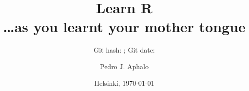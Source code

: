 \documentclass[paper=a4,headsepline,BCOR=12mm,twoside,open=right,%
titlepage,headings=small,fontsize=10pt,index=totoc,bibliography=totoc,%
captions=tableheading,captions=nooneline]{scrbook}\usepackage{knitr}
\begin{document}
\renewcommand*\chapterformat{\thechapter\autodot\hspace{1em}}

\renewcommand*\dictumwidth{0.7\linewidth}
\renewcommand*\dictumauthorformat[1]{--- #1}

\extratitle{\vspace*{2\baselineskip}%
             {\Huge\textsf{\textbf{Learn R}\\ \textsl{\huge\ldots as you learnt your mother tongue}}}}

\title{\Huge{\sffamily Learn R\\{\Large\ldots as you learnt your mother tongue}}}

\subtitle{Git hash: \gitAbbrevHash; Git date: \gitAuthorIsoDate}

\author{Pedro J. Aphalo}

\date{Helsinki, \today}

\publishers{Draft, 75\% done\\Available through \href{https://leanpub.com/learnr}{Leanpub}}

\uppertitleback{\copyright\ 2001--2016 by Pedro J. Aphalo\\
Licensed under one of the \href{http://creativecommons.org/licenses/}{Creative Commons licenses} as indicated, or when not explicitly indicated, under the \href{http://creativecommons.org/licenses/by-sa/4.0/}{CC BY-SA 4.0 license}.}

\lowertitleback{Typeset with \href{http://www.latex-project.org/}{}\ in Lucida Bright and \textsf{Lucida Sans} using the KOMA-Script book class.\\
The manuscript was written using \href{http://www.r-project.org/}{R} with package knitr. The manuscript was edited in \href{http://www.winedt.com/}{WinEdt} and \href{http://www.rstudio.com/}{RStudio}.
The source files for the whole book are available at \url{https://bitbucket.org/aphalo/using-r}.}

\frontmatter











\end{document}
